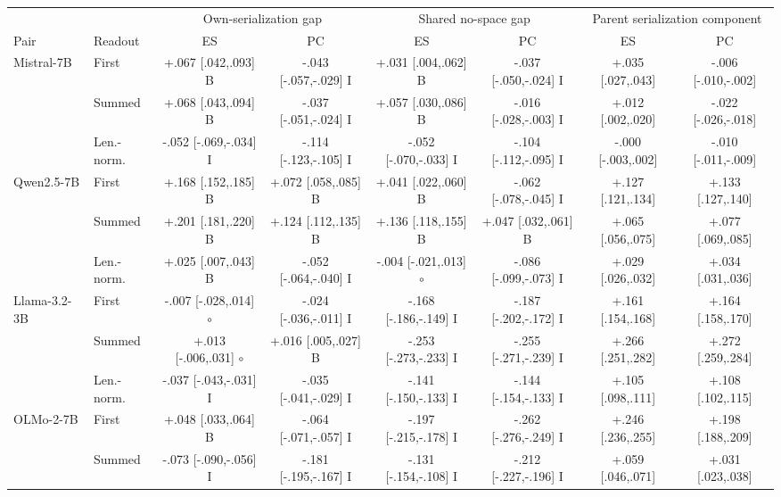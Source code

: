 \begin{table}[t]
\centering\scriptsize
\setlength{\tabcolsep}{1.5pt}
\begin{tabular}{@{}llcccccc@{}}
\toprule
& & \multicolumn{2}{c}{Own-serialization gap} & \multicolumn{2}{c}{Shared no-space gap} & \multicolumn{2}{c}{Parent serialization component} \\
\cmidrule(lr){3-4}\cmidrule(lr){5-6}\cmidrule(l){7-8}
Pair & Readout & ES & PC & ES & PC & ES & PC \\
\midrule
Mistral-7B & First & +.067 [.042,.093] B & -.043 [-.057,-.029] I & +.031 [.004,.062] B & -.037 [-.050,-.024] I & +.035 [.027,.043] & -.006 [-.010,-.002] \\
 & Summed & +.068 [.043,.094] B & -.037 [-.051,-.024] I & +.057 [.030,.086] B & -.016 [-.028,-.003] I & +.012 [.002,.020] & -.022 [-.026,-.018] \\
 & Len.-norm. & -.052 [-.069,-.034] I & -.114 [-.123,-.105] I & -.052 [-.070,-.033] I & -.104 [-.112,-.095] I & -.000 [-.003,.002] & -.010 [-.011,-.009] \\
\addlinespace[1pt]
Qwen2.5-7B & First & +.168 [.152,.185] B & +.072 [.058,.085] B & +.041 [.022,.060] B & -.062 [-.078,-.045] I & +.127 [.121,.134] & +.133 [.127,.140] \\
 & Summed & +.201 [.181,.220] B & +.124 [.112,.135] B & +.136 [.118,.155] B & +.047 [.032,.061] B & +.065 [.056,.075] & +.077 [.069,.085] \\
 & Len.-norm. & +.025 [.007,.043] B & -.052 [-.064,-.040] I & -.004 [-.021,.013] $\circ$ & -.086 [-.099,-.073] I & +.029 [.026,.032] & +.034 [.031,.036] \\
\addlinespace[1pt]
Llama-3.2-3B & First & -.007 [-.028,.014] $\circ$ & -.024 [-.036,-.011] I & -.168 [-.186,-.149] I & -.187 [-.202,-.172] I & +.161 [.154,.168] & +.164 [.158,.170] \\
 & Summed & +.013 [-.006,.031] $\circ$ & +.016 [.005,.027] B & -.253 [-.273,-.233] I & -.255 [-.271,-.239] I & +.266 [.251,.282] & +.272 [.259,.284] \\
 & Len.-norm. & -.037 [-.043,-.031] I & -.035 [-.041,-.029] I & -.141 [-.150,-.133] I & -.144 [-.154,-.133] I & +.105 [.098,.111] & +.108 [.102,.115] \\
\addlinespace[1pt]
OLMo-2-7B & First & +.048 [.033,.064] B & -.064 [-.071,-.057] I & -.197 [-.215,-.178] I & -.262 [-.276,-.249] I & +.246 [.236,.255] & +.198 [.188,.209] \\
 & Summed & -.073 [-.090,-.056] I & -.181 [-.195,-.167] I & -.131 [-.154,-.108] I & -.212 [-.227,-.196] I & +.059 [.046,.071] & +.031 [.023,.038] \\

\end{tabular}
\end{table}
